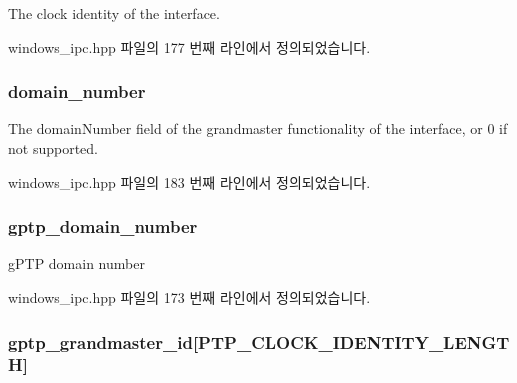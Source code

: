 The clock identity of the interface. 



windows\+\_\+ipc.\+hpp 파일의 177 번째 라인에서 정의되었습니다.

\subsubsection[{\texorpdfstring{domain\+\_\+number}{domain_number}}]{ domain\+\_\+number}\hypertarget{class_offset_a96702548f5b9222af26319c695764b29}{}\label{class_offset_a96702548f5b9222af26319c695764b29}


The domain\+Number field of the grandmaster functionality of the interface, or 0 if not supported. 



windows\+\_\+ipc.\+hpp 파일의 183 번째 라인에서 정의되었습니다.

\subsubsection[{\texorpdfstring{gptp\+\_\+domain\+\_\+number}{gptp_domain_number}}]{ gptp\+\_\+domain\+\_\+number}\hypertarget{class_offset_ac53b4e61c0f960e16c86cfe678ca256d}{}\label{class_offset_ac53b4e61c0f960e16c86cfe678ca256d}


g\+P\+TP domain number 



windows\+\_\+ipc.\+hpp 파일의 173 번째 라인에서 정의되었습니다.

\subsubsection[{\texorpdfstring{gptp\+\_\+grandmaster\+\_\+id}{gptp_grandmaster_id}}]{ gptp\+\_\+grandmaster\+\_\+id\mbox{[}{\bf P\+T\+P\+\_\+\+C\+L\+O\+C\+K\+\_\+\+I\+D\+E\+N\+T\+I\+T\+Y\+\_\+\+L\+E\+N\+G\+TH}\mbox{]}}\hypertarget{class_offset_a3545e41943aa3080a0817fb8a49fd34c}{}\label{class_offset_a3545e41943aa3080a0817fb8a49fd34c}


